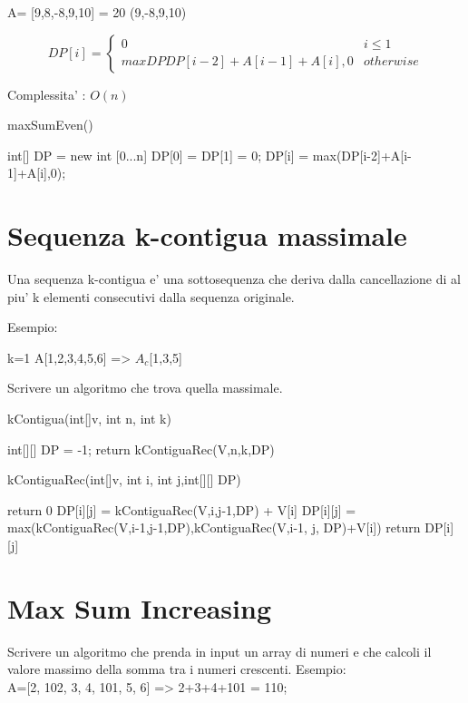 \documentclass[oneside]{book}
\begin{document}
A= [9,8,-8,9,10]  = 20 (9,-8,9,10)

\begin{equation}
  DP[i] =
    \begin{cases}
     0 & i \leq 1 \\
     maxDP{DP[i-2]+A[i-1]+A[i],0} & otherwise
    \end{cases}  
\end{equation}

Complessita' : $O(n)$

\begin{algorithm}
\caption{maxSumEven()\label{alg:cap}}
\begin{algorithmic}
\State int[] DP = new int [0...n]
\State DP[0] = DP[1] = 0;
	\State DP[i] = max(DP[i-2]+A[i-1]+A[i],0);
\EndFor
\end{algorithmic}
\end{algorithm}
\section{Sequenza k-contigua massimale}
Una sequenza k-contigua e' una sottosequenza che deriva dalla cancellazione di al piu' k elementi consecutivi dalla sequenza originale.

Esempio: 

k=1
A[1,2,3,4,5,6] => $A_c$[1,3,5] 

Scrivere un algoritmo che trova quella massimale.

\begin{algorithm}
\caption{kContigua(int[]v, int n, int k)\label{cap:alg}}
\begin{algorithmic}
\State int[][] DP = -1;
\State return kContiguaRec(V,n,k,DP)
\end{algorithmic}
\end{algorithm}

\begin{algorithm}
\caption{kContiguaRec(int[]v, int i, int j,int[][] DP)\label{cap:alg}}
\begin{algorithmic}
	\State return 0
\EndIf
{}
		\State DP[i][j] = kContiguaRec(V,i,j-1,DP) + V[i]
	\Else
		\State DP[i][j] = max(kContiguaRec(V,i-1,j-1,DP),kContiguaRec(V,i-1, j, DP)+V[i])
	\EndIf
\EndIf		
return DP[i][j]
\end{algorithmic}
\end{algorithm}

\section{Max Sum Increasing}
Scrivere un algoritmo che prenda in input un array di numeri e che calcoli il valore massimo della somma tra i numeri crescenti. Esempio:\\
A=[2, 102, 3, 4, 101, 5, 6] => 2+3+4+101 = 110;
\end{document}
